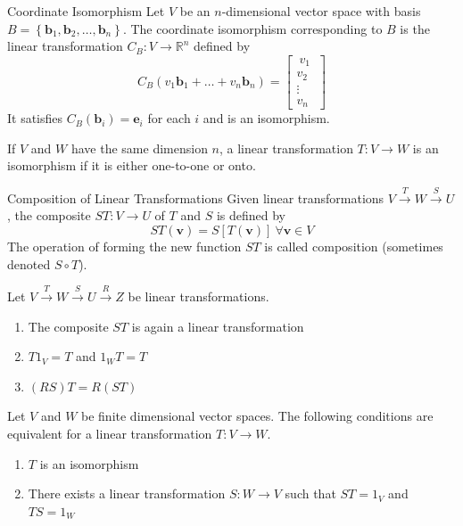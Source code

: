 \documentclass[12pt]{article}
\begin{document}
\begin{definition}{Coordinate Isomorphism}{}
    Let $ V $ be an $ n $-dimensional vector space with basis 
    $ B = \left\{ \mathbf{b}_1, \mathbf{b}_2, \dots, \mathbf{b}_n \right\} $. The coordinate isomorphism corresponding to $ B $ is the linear transformation $ C_B : V \to \mathbb{R}^n $ defined by
    \[ C_B \left( v_1 \mathbf{b}_1 + \dots + v_n \mathbf{b}_n \right) = \begin{bmatrix} \ v_1 \ \\ v_2 \\ \vdots \\ v_n \end{bmatrix} \]
    It satisfies $ C_B \left( \mathbf{b}_i \right) = \mathbf{e}_i $ for each $ i $ and is an isomorphism.
\end{definition}

\begin{theorem}{}{}
    If $ V $ and $ W $ have the same dimension $ n $, a linear transformation $ T : V \to W $ is an isomorphism if it is either one-to-one or onto.
\end{theorem}

\begin{definition}{Composition of Linear Transformations}{}
    Given linear transformations $ V \xrightarrow{T} W \xrightarrow{S} U $, the composite $ ST : V \to U $ of $ T $ and $ S $ is defined by
    \[ ST \left( \mathbf{v} \right) = S \left[ T \left( \mathbf{v} \right) \right] \ \forall \mathbf{v} \in V \]
    The operation of forming the new function $ ST $ is called composition (sometimes denoted $ S \circ T $).
\end{definition}

\begin{theorem}{}{}
    Let $ V \xrightarrow{T} W \xrightarrow{S} U \xrightarrow{R} Z $ be linear transformations.
    \begin{enumerate}[label=(\roman*)]
        \item The composite $ ST $ is again a linear transformation
        \item $ T 1_V = T $ and $ 1_W T = T $
        \item $ \left( RS \right) T = R \left( ST \right) $
    \end{enumerate}
\end{theorem}

\begin{theorem}{}{}
    Let $ V $ and $ W $ be finite dimensional vector spaces. The following conditions are equivalent for a linear transformation $ T : V \to W $.
    \begin{enumerate}[label=(\roman*)]
        \item $ T $ is an isomorphism
        \item There exists a linear transformation $ S : W \to V $ such that $ ST = 1_V $ and $ TS = 1_W $
    \end{enumerate}
\end{theorem}
\end{document}
